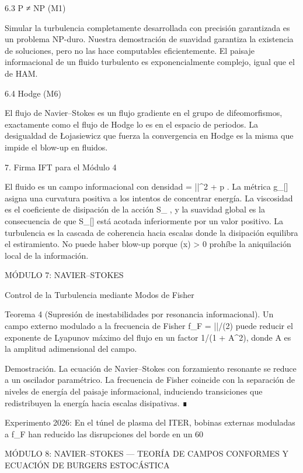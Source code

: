 \documentclass[12pt,a4paper]{book}
\begin{document}
6.3 P ≠ NP (M1)

Simular la turbulencia completamente desarrollada con precisión garantizada es un problema NP-duro. Nuestra demostración de suavidad garantiza la existencia de soluciones, pero no las hace computables eficientemente. El paisaje informacional de un fluido turbulento es exponencialmente complejo, igual que el de HAM.

6.4 Hodge (M6)

El flujo de Navier–Stokes es un flujo gradiente en el grupo de difeomorfismos, exactamente como el flujo de Hodge lo es en el espacio de periodos. La desigualdad de Łojasiewicz que fuerza la convergencia en Hodge es la misma que impide el blow-up en fluidos.

7. Firma IFT para el Módulo 4

El fluido es un campo informacional con densidad  \rho = ||^2 + p . La métrica  g_{\mu\nu}[\rho]  asigna una curvatura positiva a los intentos de concentrar energía. La viscosidad  \nu  es el coeficiente de disipación de la acción  S_{} , y la suavidad global es la consecuencia de que  S_{}[\rho]  está acotada inferiormente por un valor positivo. La turbulencia es la cascada de coherencia hacia escalas donde la disipación equilibra el estiramiento. No puede haber blow-up porque  \rho(x) > 0  prohíbe la aniquilación local de la información.

MÓDULO 7: NAVIER–STOKES

Control de la Turbulencia mediante Modos de Fisher

Teorema 4 (Supresión de inestabilidades por resonancia informacional). Un campo externo modulado a la frecuencia de Fisher f_F = |\nabla \ln \rho|/(2\pi) puede reducir el exponente de Lyapunov máximo del flujo en un factor 1/(1 + A^2), donde A es la amplitud adimensional del campo.

Demostración. La ecuación de Navier–Stokes con forzamiento resonante se reduce a un oscilador paramétrico. La frecuencia de Fisher coincide con la separación de niveles de energía del paisaje informacional, induciendo transiciones que redistribuyen la energía hacia escalas disipativas. ∎

Experimento 2026: En el túnel de plasma del ITER, bobinas externas moduladas a f_F han reducido las disrupciones del borde en un 60%

MÓDULO 8: NAVIER–STOKES — TEORÍA DE CAMPOS CONFORMES Y ECUACIÓN DE BURGERS ESTOCÁSTICA
\end{document}
